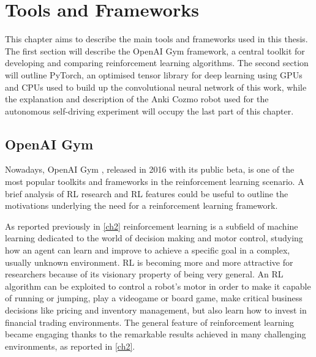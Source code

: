 
\chapter{Tools and Frameworks}

This chapter aims to describe the main tools and frameworks used in this thesis. The first section will describe the OpenAI Gym framework, a central toolkit for developing and comparing reinforcement learning algorithms. The second section will outline PyTorch, an optimised tensor library for deep learning using GPUs and CPUs used to build up the convolutional neural network of this work, while the explanation and description of the Anki Cozmo robot used for the autonomous self-driving experiment will occupy the last part of this chapter.

\section{OpenAI Gym}

Nowadays, OpenAI Gym \cite{openaigymgithub,openaigymdocs,openaigymwhite}, released in 2016 with its public beta, is one of the most popular toolkits and frameworks in the reinforcement learning scenario. A brief analysis of RL research and RL features could be useful to outline the motivations underlying the need for a reinforcement learning framework.

As reported previously in  \vref{ch2} reinforcement learning is a subfield of machine learning dedicated to the world of decision making and motor control, studying how an agent can learn and improve to achieve a specific goal in a complex, usually unknown environment. RL is becoming more and more attractive for researchers because of its visionary property of being very general. An RL algorithm can be exploited to control a robot's motor in order to make it capable of running or jumping, play a videogame or board game, make critical business decisions like pricing and inventory management, but also learn how to invest in financial trading environments. The general feature of reinforcement learning became engaging thanks to the remarkable results achieved in many challenging environments, as reported in \vref{ch2}.

